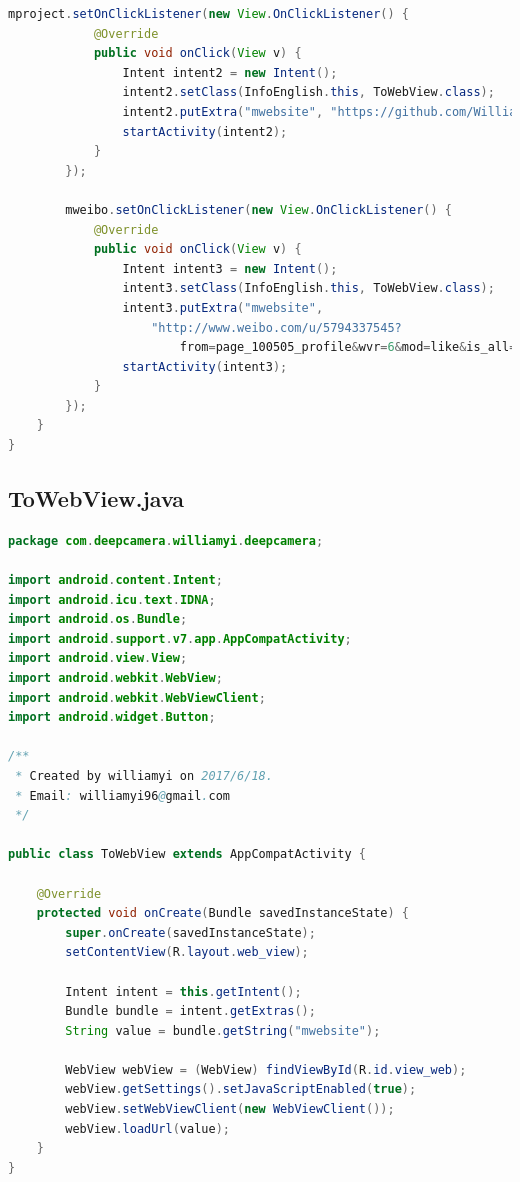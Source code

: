 \documentclass[UTF8, Microsoft YaHei]{book}
\begin{document}
\begin{small}
\begin{lstlisting}[language=java]
        mproject.setOnClickListener(new View.OnClickListener() {
            @Override
            public void onClick(View v) {
                Intent intent2 = new Intent();
                intent2.setClass(InfoEnglish.this, ToWebView.class);
                intent2.putExtra("mwebsite", "https://github.com/WilliamYi96/DeepCamera");
                startActivity(intent2);
            }
        });

        mweibo.setOnClickListener(new View.OnClickListener() {
            @Override
            public void onClick(View v) {
                Intent intent3 = new Intent();
                intent3.setClass(InfoEnglish.this, ToWebView.class);
                intent3.putExtra("mwebsite",
                	"http://www.weibo.com/u/5794337545?
                		from=page_100505_profile&wvr=6&mod=like&is_all=1");
                startActivity(intent3);
            }
        });
    }
}
\end{lstlisting}
\end{small}
    \subsection{ToWebView.java}
\begin{small}
\begin{lstlisting}[language=java]
package com.deepcamera.williamyi.deepcamera;

import android.content.Intent;
import android.icu.text.IDNA;
import android.os.Bundle;
import android.support.v7.app.AppCompatActivity;
import android.view.View;
import android.webkit.WebView;
import android.webkit.WebViewClient;
import android.widget.Button;

/**
 * Created by williamyi on 2017/6/18.
 * Email: williamyi96@gmail.com
 */

public class ToWebView extends AppCompatActivity {

    @Override
    protected void onCreate(Bundle savedInstanceState) {
        super.onCreate(savedInstanceState);
        setContentView(R.layout.web_view);

        Intent intent = this.getIntent();
        Bundle bundle = intent.getExtras();
        String value = bundle.getString("mwebsite");

        WebView webView = (WebView) findViewById(R.id.view_web);
        webView.getSettings().setJavaScriptEnabled(true);
        webView.setWebViewClient(new WebViewClient());
        webView.loadUrl(value);
    }
}
\end{lstlisting}
\end{small}
\end{document}
